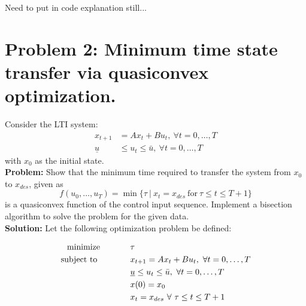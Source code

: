 \documentclass[letter]{article}
\newcommand{\optpblm}[3][eq:default]{
	\begin{equation}\label{#1}
		\begin{aligned}
			\text{minimize} \hspace{0.5in} &#2\vspace{5pt}\\
			\text{subject to \hspace{0.5in}} &#3
		\end{aligned}	
	\end{equation}
}
\begin{document}
{\Huge Need to put in code explanation still...}





















\newpage
\section{Problem 2: Minimum time state transfer via quasiconvex optimization.}
Consider the LTI system:
\begin{equation}\label{eq:quasiconvex_opt_def}
	\begin{aligned}
		x_{t+1} &= Ax_t + B u_t, \ \forall t = 0,\dots,T\\
		\underline{u} &\leq u_t \leq \bar{u}, \ \forall t = 0,\dots,T
	\end{aligned}
\end{equation}
with $x_0$ as the initial state.\\

\textbf{Problem:}
Show that the minimum time required to transfer the system from $x_0$ to $x_{des}$, given as
\begin{equation}\label{eq:qualiconvex_problem_result}
	f(u_0,\dots,u_T) = \min \{\tau \ | \ x_t = x_{des} \ \text{for} \ \tau \leq t \leq {T+1}\}
\end{equation}
is a quasiconvex function of the control input sequence. Implement a bisection algorithm to solve the problem for the given data.\\

\textbf{Solution:}
Let the following optimization problem be defined:
\optpblm{\tau}{
	x_{t+1} = Ax_t + B u_t, \ \forall t = 0,\dots,T\\
	&\underline{u} \leq u_t \leq \bar{u}, \ \forall t = 0,\dots,T\\
	& x(0) = x_0\\
	& x_t = x_{des} \ \forall \ \tau \leq t \leq T+1
	}
\end{document}
